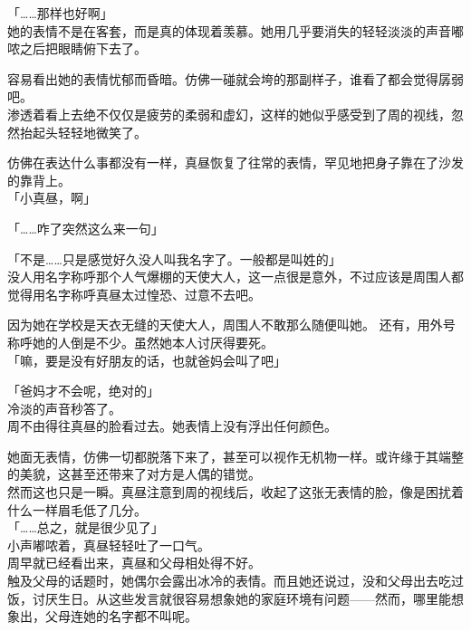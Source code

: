 「……那样也好啊」\\

她的表情不是在客套，而是真的体现着羡慕。她用几乎要消失的轻轻淡淡的声音嘟哝之后把眼睛俯下去了。

容易看出她的表情忧郁而昏暗。仿佛一碰就会垮的那副样子，谁看了都会觉得孱弱吧。\\

渗透着看上去绝不仅仅是疲劳的柔弱和虚幻，这样的她似乎感受到了周的视线，忽然抬起头轻轻地微笑了。

仿佛在表达什么事都没有一样，真昼恢复了往常的表情，罕见地把身子靠在了沙发的靠背上。\\

「小真昼，啊」

「……咋了突然这么来一句」

「不是……只是感觉好久没人叫我名字了。一般都是叫姓的」\\

没人用名字称呼那个人气爆棚的天使大人，这一点很是意外，不过应该是周围人都觉得用名字称呼真昼太过惶恐、过意不去吧。

因为她在学校是天衣无缝的天使大人，周围人不敢那么随便叫她。
还有，用外号称呼她的人倒是不少。虽然她本人讨厌得要死。\\

「嘛，要是没有好朋友的话，也就爸妈会叫了吧」

「爸妈才不会呢，绝对的」\\

冷淡的声音秒答了。\\

周不由得往真昼的脸看过去。她表情上没有浮出任何颜色。

她面无表情，仿佛一切都脱落下来了，甚至可以视作无机物一样。或许缘于其端整的美貌，这甚至还带来了对方是人偶的错觉。\\

然而这也只是一瞬。真昼注意到周的视线后，收起了这张无表情的脸，像是困扰着什么一样眉毛低了几分。\\

「……总之，就是很少见了」\\

小声嘟哝着，真昼轻轻吐了一口气。\\

周早就已经看出来，真昼和父母相处得不好。\\

触及父母的话题时，她偶尔会露出冰冷的表情。而且她还说过，没和父母出去吃过饭，讨厌生日。从这些发言就很容易想象她的家庭环境有问题——然而，哪里能想象出，父母连她的名字都不叫呢。\\

